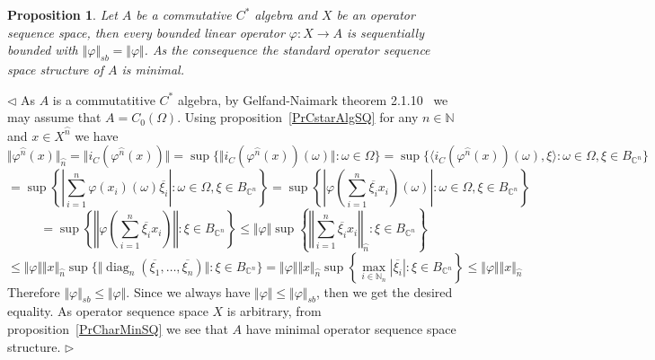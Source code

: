 \documentclass[12pt]{article}
\newtheorem{proposition}[theorem]{Proposition}
\newenvironment{proof}{\par $\triangleleft$}{$\triangleright$}
\begin{document}
\begin{proposition}\label{PrCommCstarAlgIsMin} Let $A$ be a commutative $C^*$ 
algebra and $X$ be an operator sequence space, then every bounded linear 
operator $\varphi:X\to A$ is sequentially bounded 
with $\Vert\varphi\Vert_{sb}=\Vert\varphi\Vert$. As the consequence the 
standard operator sequence space structure of $A$ is minimal.
\end{proposition}
\begin{proof} As $A$ is a commutatitive $C^*$ algebra, by Gelfand-Naimark 
theorem 2.1.10~\cite{MurphCstarOpTh} we may assume that $A=C_0(\Omega)$. 
Using proposition~\ref{PrCstarAlgSQ} for any $n\in\mathbb{N}$ 
and $x\in X^{\wideparen{n}}$ we have 
$$
\Vert\varphi^{\wideparen{n}}(x)\Vert_{\wideparen{n}} 
=\Vert i_C(\varphi^{\wideparen{n}}(x))\Vert 
=\sup \{
    \Vert
        i_C(\varphi^{\wideparen{n}}(x))(\omega)
    \Vert
    :\omega\in\Omega
 \} 
=\sup \{
    \langle
        i_C(\varphi^{\wideparen{n}}(x))(\omega),\xi
    \rangle
    :\omega\in\Omega,\xi\in B_{\mathbb{C}^n}
 \}
$$
$$
=\sup\left \{
    \left|\sum_{i=1}^n \varphi(x_i)(\omega)\overline{\xi_i}\right|
    :\omega\in\Omega,\xi\in B_{\mathbb{C}^n}
\right \}
=\sup\left \{
    \left| \varphi\left(\sum_{i=1}^n \overline{\xi_i} x_i\right)(\omega)\right|
    :\omega\in\Omega,\xi\in B_{\mathbb{C}^n}
\right \}
$$
$$
=\sup\left \{\left\Vert \varphi\left(\sum_{i=1}^n \overline{\xi_i}
x_i\right)\right\Vert:\xi\in B_{\mathbb{C}^n}\right \}
\leq\Vert\varphi\Vert\sup\left \{\left\Vert \sum_{i=1}^n \overline{\xi_i}
x_i\right\Vert_{\wideparen{n}}:\xi\in B_{\mathbb{C}^n}\right \}
$$
$$
\leq
\Vert\varphi\Vert
\Vert x\Vert_{\wideparen{n}}
\sup \{
    \Vert
        \operatorname{diag}_n(\overline{\xi_1},\ldots,\overline{\xi_n})
    \Vert
:\xi\in B_{\mathbb{C}^n}
 \}
=\Vert\varphi\Vert\Vert x\Vert_{\wideparen{n}}
\sup\left \{
    \max_{i\in\mathbb{N}_n}|\overline{\xi_i}|
    :\xi\in B_{\mathbb{C}^n}
\right \}
\leq\Vert\varphi\Vert\Vert x\Vert_{\wideparen{n}}
$$
Therefore $\Vert\varphi\Vert_{sb}\leq\Vert\varphi\Vert$. Since we always 
have $\Vert\varphi\Vert\leq\Vert\varphi\Vert_{sb}$, then we get the desired 
equality. As operator sequence space $X$ is arbitrary, from 
proposition~\ref{PrCharMinSQ} we see that $A$ have minimal operator 
sequence space structure.
\end{proof}
\end{document}
